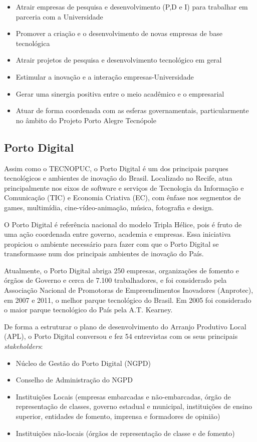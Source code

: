\begin{itemize}
\item Atrair empresas de pesquisa e desenvolvimento (P,D e I) para trabalhar em parceria com a Universidade
\item Promover a criação e o desenvolvimento de novas empresas de base tecnológica
\item Atrair projetos de pesquisa e desenvolvimento tecnológico em geral
\item Estimular a inovação e a interação empresas-Universidade
\item Gerar uma sinergia positiva entre o meio acadêmico e o empresarial
\item Atuar de forma coordenada com as esferas governamentais, particularmente no âmbito do Projeto Porto Alegre Tecnópole
\end{itemize}

\subsection{Porto Digital}

Assim como o TECNOPUC, o Porto Digital é um dos principais parques tecnológicos e ambientes de inovação do Brasil. Localizado no Recife, atua principalmente nos eixos de software e serviços de Tecnologia da Informação e Comunicação (TIC) e Economia Criativa (EC), com ênfase nos segmentos de games, multimídia, cine-vídeo-animação, música, fotografia e design.

O Porto Digital é referência nacional do modelo Tripla Hélice, pois é fruto de uma ação coordenada entre governo, academia e empresas. Essa iniciativa propiciou o ambiente necessário para fazer com que o Porto Digital se transformasse num dos principais ambientes de inovação do País. 

Atualmente, o Porto Digital abriga 250 empresas, organizações de fomento e órgãos de Governo e cerca de 7.100 trabalhadores, e foi considerado pela Associação Nacional de Promotoras de Empreendimentos Inovadores (Anprotec), em 2007 e 2011, o melhor parque tecnológico do Brasil. Em 2005 foi considerado o maior parque tecnológico do País pela A.T. Kearney.

De forma a estruturar o plano de desenvolvimento do Arranjo Produtivo Local (APL), o Porto Digital conversou e fez 54 entrevistas com os seus principais \textit{stakeholders}:

\begin{itemize}
\item Núcleo de Gestão do Porto Digital (NGPD)
\item Conselho de Administração do NGPD
\item Instituições Locais (empresas embarcadas e não-embarcadas, órgão de representação de classes, governo estadual e municipal, instituições de ensino superior, entidades de fomento, imprensa e formadores de opinião)
\item Instituições não-locais (órgãos de representação de classe e de fomento)
\end{itemize}


